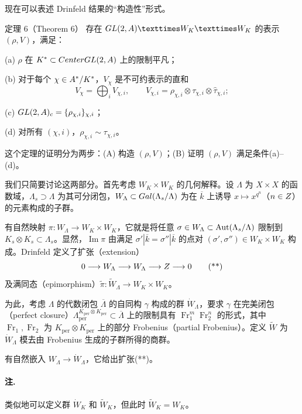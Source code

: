 现在可以表述 Drinfeld 结果的“构造性”形式。
\begin{originaltheorem}{定理 6（Theorem 6）}
存在 $\GL(2,\A)\times W_K\times W_K$ 的表示 $(\rho,V)$，满足：

(a) $\rho$ 在 $K^*\subset CenterGL(2,A)$ 上的限制平凡；

(b) 对于每个 $\chi\in A^*/K^*$，$V_\chi$ 是不可约表示的直和
\[
 V_\chi=\bigoplus_i V_{\chi,i},\qquad
 V_{\chi,i}=\rho_{\chi,i}\otimes\tau_{\chi,i}\otimes\widehat\tau_{\chi,i};
\]

(c) $GL(2,A)_c=\{\rho_{\chi,i}\}_{\chi,i}$；

(d) 对所有 $(\chi,i)$，$\rho_{\chi,i}\sim\tau_{\chi,i}$。
\end{originaltheorem}

这个定理的证明分为两步：(A) 构造 $(\rho,V)$；(B) 证明 $(\rho,V)$ 满足条件(a)--(d)。

我们只简要讨论这两部分。首先考虑 $W_K\times W_K$ 的几何解释。设 $\Lambda$ 为 $X\times X$ 的函数域，$\Lambda_s\supset\Lambda$ 为其可分闭包，$W_\Lambda\subset Gal(\Lambda_s/\Lambda)$ 为在 $\overline k$ 上诱导 $x\mapsto x^{q^n}$（$n\in Z$）的元素构成的子群。

有自然映射 $\pi:W_\Lambda\longrightarrow W_K\times W_K$，它就是将任意 $\sigma\in W_\Lambda\subset\Aut(\Lambda_s/\Lambda)$ 限制到 $K_s\otimes K_s\subset\Lambda_s$。显然，$\operatorname{Im}\pi$ 由满足 $\sigma'|\overline k=\sigma''|\overline k$ 的点对 $(\sigma',\sigma'')\in W_K\times W_K$ 构成。Drinfeld 定义了扩张（extension）
\[
 0\longrightarrow W_\Lambda\longrightarrow W_\Lambda
 \longrightarrow Z\longrightarrow0\tag{**}
\]
及满同态（epimorphism）$\widetilde\pi:\widetilde W_\Lambda\longrightarrow W_K\times W_K$。

为此，考虑 $\Lambda$ 的代数闭包 $\overline\Lambda$ 的自同构 $\gamma$ 构成的群 $\dot W_\Lambda$，要求 $\gamma$ 在完美闭包（perfect closure）$\Lambda^{K_{\mathrm{per}}\otimes K_{\mathrm{per}}}_{\mathrm{per}}\subset\overline\Lambda$ 上的限制具有 $\operatorname{Fr}_1^m\operatorname{Fr}_2^n$ 的形式，其中 $\operatorname{Fr}_1,\operatorname{Fr}_2$ 为 $K_{\mathrm{per}}\otimes K_{\mathrm{per}}$ 上的部分 Frobenius（partial Frobenius）。定义 $\widetilde W$ 为 $\dot W_\Lambda$ 模去由 Frobenius 生成的子群所得的商群。

有自然嵌入 $W_\Lambda\longrightarrow\dot W_\Lambda$，它给出扩张(**)。
\paragraph*{注.} 类似地可以定义群 $\dot W_K$ 和 $\widetilde W_K$，但此时 $\widetilde W_K=W_K$。


